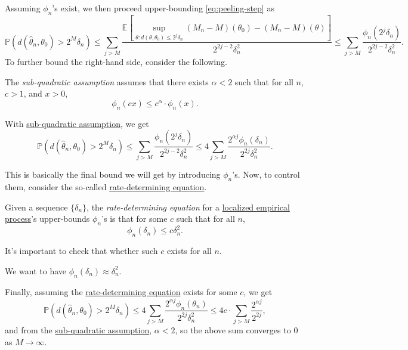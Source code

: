 Assuming \(\phi _n\)'s exist, we then proceed upper-bounding \autoref{eq:peeling-step} as
\[
	\mathbb{P} (d(\hat{\theta} _n, \theta _0) > 2^M \delta _n)
	\leq \sum_{j > M} \frac{\mathbb{E}_{}\left[\sup _{\theta \colon d(\theta , \theta _0) \leq 2^j \delta _n} (M_n - M)(\theta _0) - (M_n - M)(\theta ) \right] }{2^{2j - 2} \delta _n^2 }
	\leq \sum_{j > M} \frac{\phi _n(2^j \delta _n)}{2^{2j - 2} \delta _n^2}.
\]
To further bound the right-hand side, consider the following.

\begin{definition}\label{def:sub-quadratic-assumption}
	The \emph{sub-quadratic assumption} assumes that there exists \(\alpha < 2\) such that for all \(n\), \(c > 1\), and \(x > 0\),
	\[
		\phi _n(cx) \leq c^\alpha \cdot \phi _n(x).
	\]
\end{definition}

With \hyperref[def:sub-quadratic-assumption]{sub-quadratic assumption}, we get
\[
	\mathbb{P} (d(\hat{\theta} _n, \theta _0) > 2^M \delta _n)
	\leq \sum_{j > M} \frac{\phi _n(2^j \delta _n)}{2^{2j - 2} \delta _n^2}
	\leq 4 \sum_{j > M} \frac{2^{\alpha j} \phi _n(\delta _n)}{2^{2j} \delta _n^2}.
\]

This is basically the final bound we will get by introducing \(\phi _n\)'s. Now, to control them, consider the so-called \hyperref[def:rate-determining-equation]{rate-determining equation}.

\begin{definition}\label{def:rate-determining-equation}
	Given a sequence \(\{ \delta _n \} \), the \emph{rate-determining equation} for a \hyperref[def:localized-EP]{localized empirical process}'s upper-bounds \(\phi _n\)'s is that for some \(c\) such that for all \(n\),
	\[
		\phi _n(\delta _n) \leq c \delta _n^2.
	\]
\end{definition}

\begin{remark}
	It's important to check that whether such \(c\) exists for all \(n\).
\end{remark}

\begin{intuition}
	We want to have \(\phi _n(\delta _n) \approx \delta _n^2\).
\end{intuition}

Finally, assuming the \hyperref[def:rate-determining-equation]{rate-determining equation} exists for some \(c\), we get
\[
	\mathbb{P} (d(\hat{\theta} _n, \theta _0) > 2^M \delta _n)
	\leq 4 \sum_{j > M} \frac{2^{\alpha j} \phi _n(\theta _n)}{2^{2j} \delta _n^2}
	\leq 4c\cdot \sum_{j > M} \frac{2^{\alpha j}}{2^{2j}} ,
\]
and from the \hyperref[def:sub-quadratic-assumption]{sub-quadratic assumption}, \(\alpha < 2\), so the above sum converges to \(0\) as \(M \to \infty \).


